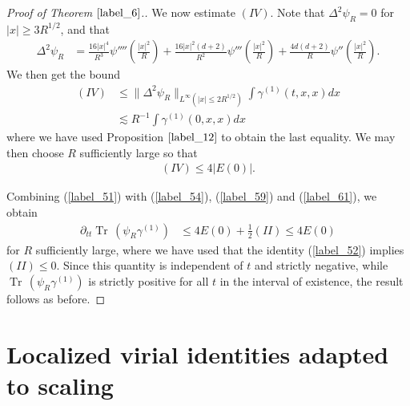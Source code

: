 \documentclass[reqno]{amsart}
\numberwithin{equation}{section}
\theoremstyle{remark}
\DeclareMathOperator{\Tr}{Tr\,}
\begin{document}
\begin{proof}[Proof of Theorem $\ref{label_6}$.]
We now estimate $(IV)$.  Note that $\Delta^2\psi_R=0$ for $|x|\geq 3R^{1/2}$, and that
\begin{align*}
\Delta^2\psi_R&=\frac{16|x|^4}{R^3}\psi''''(\frac{|x|^2}{R})+\frac{16|x|^2(d+2)}{R^2}\psi'''(\frac{|x|^2}{R})+\frac{4d(d+2)}{R}\psi''(\frac{|x|^2}{R}).
\end{align*}
We then get the bound
\begin{align}
\nonumber (IV)&\leq \lVert \Delta^2\psi_R\rVert_{L^\infty(|x|\leq 2R^{1/2})}\int \gamma^{(1)}(t,x,x)dx\\
\label{label_60}&\lesssim R^{-1}\int \gamma^{(1)}(0,x,x) dx
\end{align}
where we have used Proposition $\ref{label_12}$ to obtain the last equality.  We may then choose $R$ sufficiently large so that 
\begin{align}
(IV)\leq 4|E(0)|.\label{label_61}
\end{align}  

Combining (\ref{label_51}) with (\ref{label_54}), (\ref{label_59}) and (\ref{label_61}), we obtain
\begin{align*}
\partial_{tt}\Tr(\psi_R\gamma^{(1)})&\leq 4E(0)+\frac{1}{2}(II)\leq 4E(0)
\end{align*}
for $R$ sufficiently large, where we have used that the identity (\ref{label_52}) implies $(II)\leq 0$.  Since this quantity is independent of $t$ and strictly negative, while $\Tr(\psi_R\gamma^{(1)})$ is strictly positive for all $t$ in the interval of existence, the result follows as before.
\end{proof}

\appendix

%
%
%
%

\section{Localized virial identities adapted to scaling}
\label{label_app_localized}
\end{document}
